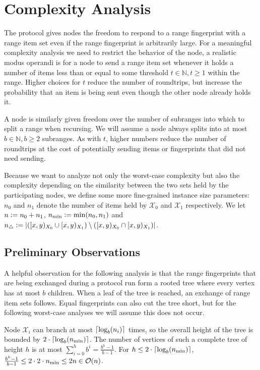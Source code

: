 \section{Complexity Analysis}
\label{set-reconciliation-complexity}

The protocol gives nodes the freedom to respond to a range fingerprint with a range item set even if the range fingerprint is arbitrarily large. For a meaningful complexity analysis we need to restrict the behavior of the node, a realistic modus operandi is for a node to send a range item set whenever it holds a number of items less than or equal to some threshold $t \in \mathbb{N}, t \geq 1$ within the range. Higher choices for $t$ reduce the number of roundtrips, but increase the probability that an item is being sent even though the other node already holds it.

A node is similarly given freedom over the number of subranges into which to split a range when recursing. We will assume a node always splits into at most $b \in \mathbb{N}, b \geq 2$ subranges. As with $t$, higher numbers reduce the number of roundtrips at the cost of potentially sending items or fingerprints that did not need sending.

Because we want to analyze not only the worst-case complexity but also the complexity depending on the similarity between the two sets held by the participating nodes, we define some more fine-grained instance size parameters: $n_0$ and $n_1$ denote the number of items held by $\mathcal{X}_0$ and $\mathcal{X}_1$ respectively. We let $n \vcentcolon= n_0 + n_1$, $n_{\min} \vcentcolon= \min(n_0, n_1)$ and $n_{\triangle} \vcentcolon= |{([{x},{y})_{X_0} \cup [{x},{y})_{X_1}) \setminus ([{x},{y})_{X_0} \cap [{x},{y})_{X_1})}|$.

\subsection{Preliminary Observations}

A helpful observation for the following analysis is that the range fingerprints that are being exchanged during a protocol run form a rooted tree where every vertex has at most $b$ children. When a leaf of the tree is reached, an exchange of range item sets follows. Equal fingerprints can also cut the tree short, but for the following worst-case analyses we will assume this does not occur.

Node $\mathcal{X}_i$ can branch at most $\lceil\log_{b}(n_i)\rceil$ times, so the overall height of the tree is bounded by $2 \cdot\lceil\log_{b}(n_{\min})\rceil$. The number of vertices of such a complete tree of height $h$ is at most $\sum_{i=0}^{h} b^{i} = \frac{b^{h} - 1}{b - 1}$. For $h \leq 2 \cdot\lceil\log_{b}(n_{\min})\rceil$, $\frac{b^{h} - 1}{b - 1} \leq 2 \cdot 2 \cdot n_{\min} \leq 2n \in \mathcal{O}(n)$.

